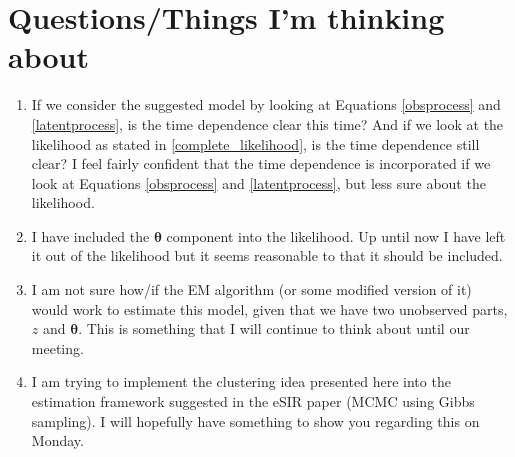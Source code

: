 \documentclass[10pt,a4paper]{article}
\begin{document}
\section{Questions/Things I'm thinking about}
\begin{enumerate}
	
	\item If we consider the suggested model by looking at Equations \ref{obsprocess} and \ref{latentprocess}, is the time dependence clear this time? And if we look at the likelihood as stated in \ref{complete_likelihood}, is the time dependence still clear? I feel fairly confident that the time dependence is incorporated if we look at Equations \ref{obsprocess} and \ref{latentprocess}, but less sure about the likelihood.
	
	\item I have included the $\boldsymbol{\theta}$ component into the likelihood. Up until now I have left it out of the likelihood but it seems reasonable to that it should be included. 
	
	\item I am not sure how/if the EM algorithm (or some modified version of it) would work to estimate this model, given that we have two unobserved parts, $z$ and $\boldsymbol{\theta}$. This is something that I will continue to think about until our meeting. 
	
	\item I am trying to implement the clustering idea presented here into the estimation framework suggested in the eSIR paper (MCMC using Gibbs sampling). I will hopefully have something to show you regarding this on Monday. 
\end{enumerate}

\printbibliography
\end{document}
